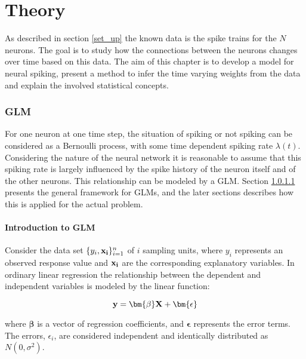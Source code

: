 
\chapter{Theory}

As described in section \ref{set_up} the known data is the spike trains for the $N$ neurons. The goal is to study how the connections between the neurons changes over time based on this data. The aim of this chapter is to develop a model for neural spiking, present a method to infer the time varying weights from the data and explain the involved statistical concepts. 

\subsection{GLM}
\label{GLM}
For one neuron at one time step, the situation of spiking or not spiking can be considered as a Bernoulli process, with some time dependent spiking rate $\lambda (t)$. Considering the nature of the neural network it is reasonable to assume that this spiking rate is largely influenced by the spike history of the neuron itself and of the other neurons. This relationship can be modeled by a GLM. Section \ref{Intro_GLM} presents the general framework for GLMs, and the later sections describes how this is applied for the actual problem. 
\subsubsection{Introduction to GLM}
\label{Intro_GLM}
Consider the data set $ \{y_{i}, \bold{x_{i}}\}_{i=1}^{n} $ of $i$ sampling units, where $y_i$ represents an observed response value and $ \bold{x_i}$ are the corresponding explanatory variables. In ordinary linear regression the relationship between the dependent and independent variables is modeled by the linear function:

\begin{equation}
    \textbf{y} = \bm{\beta}\bf X + \bm{ \epsilon}
\end{equation}

where $\bm{\beta}$ is a vector of regression coefficients, and $\bm{ \epsilon}$ represents the error terms. The errors, $\epsilon_{i}$, are considered independent and identically distributed as $N(0, \sigma^{2})$.


